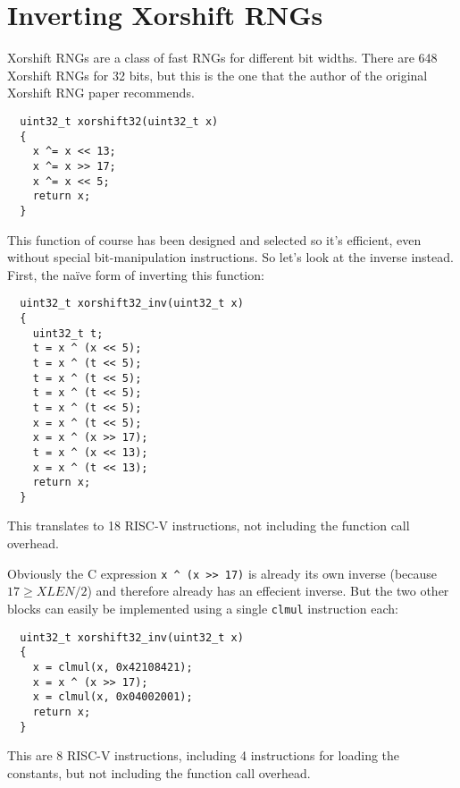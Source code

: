 \section{Inverting Xorshift RNGs}
\label{invxorshift}

Xorshift RNGs are a class of fast RNGs for different bit widths. There are 648
Xorshift RNGs for 32 bits, but this is the one that the author of the original
Xorshift RNG paper recommends.~\cite[p. 4]{Xorshift}

\begin{minipage}{\linewidth}
\begin{verbatim}
  uint32_t xorshift32(uint32_t x)
  {
    x ^= x << 13;
    x ^= x >> 17;
    x ^= x << 5;
    return x;
  }
\end{verbatim}
\end{minipage}

This function of course has been designed and selected so it's efficient, even
without special bit-manipulation instructions. So let's look at the inverse
instead. First, the na\"ive form of inverting this function:

\begin{minipage}{\linewidth}
\begin{verbatim}
  uint32_t xorshift32_inv(uint32_t x)
  {
    uint32_t t;
    t = x ^ (x << 5);
    t = x ^ (t << 5);
    t = x ^ (t << 5);
    t = x ^ (t << 5);
    t = x ^ (t << 5);
    x = x ^ (t << 5);
    x = x ^ (x >> 17);
    t = x ^ (x << 13);
    x = x ^ (t << 13);
    return x;
  }
\end{verbatim}
\end{minipage}

This translates to 18 RISC-V instructions, not including the function call overhead.

Obviously the C expression {\tt x \^{} (x >> 17)} is already its own inverse
(because $17 \ge XLEN/2$) and therefore already has an effecient inverse. But the two
other blocks can easily be implemented using a single {\tt clmul} instruction each:

\begin{minipage}{\linewidth}
\begin{verbatim}
  uint32_t xorshift32_inv(uint32_t x)
  {
    x = clmul(x, 0x42108421);
    x = x ^ (x >> 17);
    x = clmul(x, 0x04002001);
    return x;
  }
\end{verbatim}
\end{minipage}

This are 8 RISC-V instructions, including 4 instructions for loading the
constants, but not including the function call overhead.

